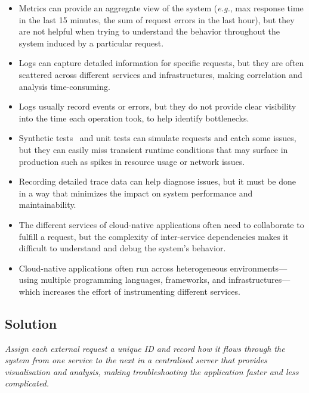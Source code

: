 \documentclass[runningheads]{llncs}
\begin{document}
\begin{itemize}
    \item Metrics can provide an aggregate view of the system (\textit{e.g.}, max response time in the last 15 minutes, the sum of request errors in the last hour), but they are not helpful when trying to understand the behavior throughout the system induced by a particular request.
    \item Logs can capture detailed information for specific requests, but they are often scattered across different services and infrastructures, making correlation and analysis time-consuming.
    \item Logs usually record events or errors, but they do not provide clear visibility into the time each operation took, to help identify bottlenecks.
    \item Synthetic tests~\cite{albuquerque2022proactive} and unit tests can simulate requests and catch some issues, but they can easily miss transient runtime conditions that may surface in production such as spikes in resource usage or network issues.
    \item Recording detailed trace data can help diagnose issues, but it must be done in a way that minimizes the impact on system performance and maintainability.
    \item The different services of cloud-native applications often need to collaborate to fulfill a request, but the complexity of inter-service dependencies makes it difficult to understand and debug the system’s behavior.
    \item Cloud-native applications often run across heterogeneous environments---using multiple programming languages, frameworks, and infrastructures---which increases the effort of instrumenting different services.
\end{itemize}

\subsection{Solution}
\textit{Assign each external request a unique ID and record how it flows through the system from one service to the next in a centralised server that provides visualisation and analysis, making troubleshooting the application faster and less complicated.}
\vspace{0.3cm}
\end{document}
